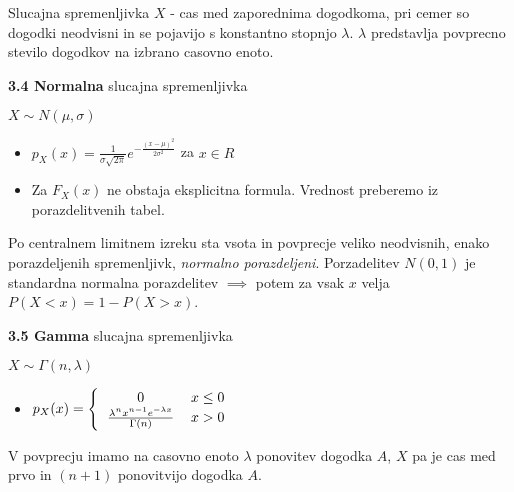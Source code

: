 \documentclass{article}
\begin{document}
\begin{multicols}{3}
Slucajna spremenljivka $X$ - cas med zaporednima dogodkoma,
pri cemer so dogodki neodvisni in se pojavijo s konstantno
stopnjo $\lambda$. $\lambda$ predstavlja povprecno stevilo dogodkov
na izbrano casovno enoto.

\textbf{3.4 Normalna} slucajna spremenljivka
\begin{center}
    \begin{math}
        X \sim N(\mu, \sigma )
    \end{math}
\end{center}

\begin{itemize}
    \item  \begin{math}
        p_{X}(x) = \frac{1}{\sigma \sqrt{2 \pi}} e^{- \frac{(x - \mu)^{2}}{2 \sigma^{2}}}
    \end{math} za $x \in R$ 
    
     \item Za $F_{X}(x)$ ne obstaja eksplicitna formula. Vrednost preberemo iz porazdelitvenih tabel.
\end{itemize}
Po centralnem limitnem izreku sta vsota in povprecje veliko neodvisnih, enako porazdeljenih
spremenljivk, \textit{normalno porazdeljeni}.
Porzadelitev $N(0, 1)$ je standardna normalna porazdelitev $\implies$ potem za vsak $x$ velja
\begin{math}
    P(X < x) = 1 - P(X > x)
\end{math}.

\textbf{3.5 Gamma} slucajna spremenljivka
\begin{center}
    \begin{math}
        X \sim \Gamma(n, \lambda)
    \end{math}
\end{center}

\begin{itemize}
    \item  \begin{math}
        p_{X}(x) =
        \Bigg\{\begin{tabular}{ccc}
          $0$  & $x \leq 0$ & \\
          $\frac{\lambda^{n} x^{n- 1} e^{ - \lambda x}}{\Gamma(n)}$ & $x > 0$ & \\
        \end{tabular}
    \end{math} 
\end{itemize}

V povprecju imamo na casovno enoto $\lambda$ ponovitev dogodka $A$, $X$ pa je cas med
prvo in $(n + 1)$ ponovitvijo dogodka $A$.


\end{multicols}
\end{document}
